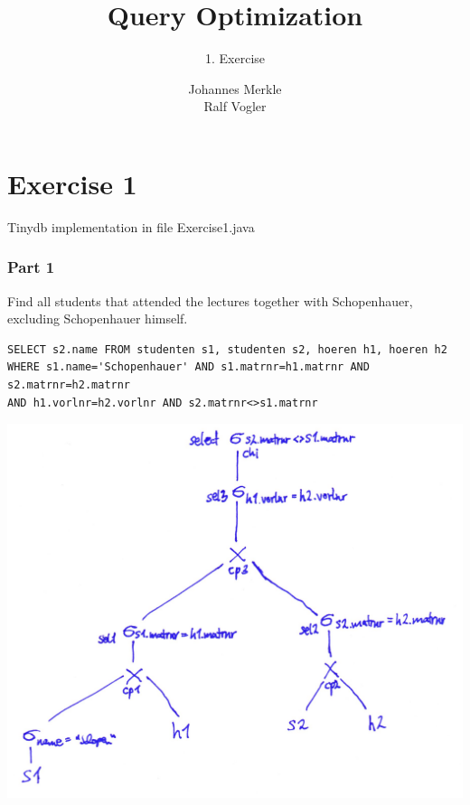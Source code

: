 \documentclass[11pt,a4paper]{scrartcl}
\begin{document}
\author{Johannes Merkle\\Ralf Vogler}
\title{Query Optimization}
\subtitle{1. Exercise}

\maketitle

\section*{Exercise 1}
Tinydb implementation in file Exercise1.java
\subsubsection*{Part 1}
Find all students that attended the lectures together with Schopenhauer, excluding
Schopenhauer himself.
\begin{verbatim}
SELECT s2.name FROM studenten s1, studenten s2, hoeren h1, hoeren h2
WHERE s1.name='Schopenhauer' AND s1.matrnr=h1.matrnr AND s2.matrnr=h2.matrnr
AND h1.vorlnr=h2.vorlnr AND s2.matrnr<>s1.matrnr
\end{verbatim}
\includegraphics[scale=.17]{part1.jpg}
\end{document}
